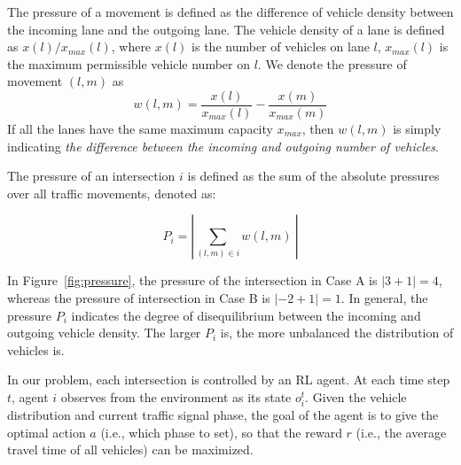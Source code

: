 \begin{definition}
The pressure of a movement is defined as the difference of vehicle density between the incoming lane and the outgoing lane. The vehicle density of a lane is defined as $x(l)/x_{max}(l)$, where $x(l)$ is the number of vehicles on lane $l$, $x_{max}(l)$ is the maximum permissible vehicle number on $l$. We denote the pressure of movement $(l,m)$ as
\begin{equation}
\label{eq:pressure-movement}
w(l,m)=\frac{x(l)}{x_{max}(l)}-\frac{x(m)}{x_{max}(m)}
\end{equation}
If all the lanes have the same maximum capacity $x_{max}$, then $w(l,m)$ is simply indicating \textit{the difference between the incoming and outgoing number of vehicles}. 

The pressure of an intersection $i$ is defined as the sum of the absolute pressures over all traffic movements, denoted as:

\begin{equation}
    \label{eq:pressure}
    P_i = |\sum_{(l,m)\in i}w(l,m)\ |
\end{equation}

In Figure~\ref{fig:pressure}, the pressure of the intersection in Case A is $|3+1|=4$, whereas the pressure of intersection in Case B is $|-2+1|=1$. In general, the pressure $P_i$ indicates the degree of disequilibrium between the incoming and outgoing vehicle density. The larger $P_i$ is, the more unbalanced the distribution of vehicles is.
\end{definition}
\vspace{-3mm}
\begin{problem}
In our problem, each intersection is controlled by an RL agent.  At each time step $t$, agent $i$ observes from the environment as its state $o^t_i$. Given the vehicle distribution and current traffic signal phase, the goal of the agent is to give the optimal action $a$ (i.e., which phase to set), so that the reward $r$ (i.e., the average travel time of all vehicles) can be maximized. %
\end{problem}



